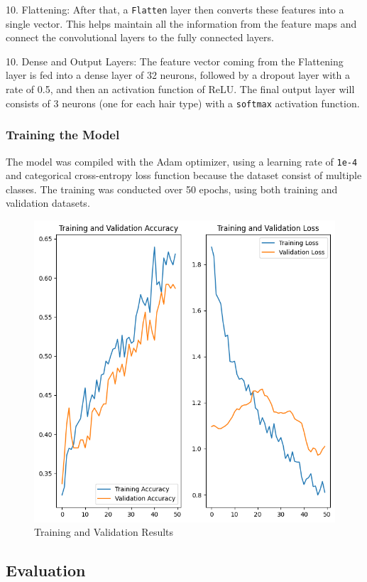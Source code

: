 10. Flattening: After that, a \texttt{Flatten} layer then converts these features into a single vector. This helps maintain all the information from the feature maps and connect the convolutional layers to the fully connected layers.

10. Dense and Output Layers: The feature vector coming from the Flattening layer is fed into a dense layer of 32 neurons, followed by a dropout layer with a rate of 0.5, and then an activation function of ReLU. The final output layer will consists of 3 neurons (one for each hair type) with a \texttt{softmax} activation function.

\subsubsection{Training the Model}

The model was compiled with the Adam optimizer, using a learning rate of \texttt{1e-4} and categorical cross-entropy loss function because the dataset consist of multiple classes. The training was conducted over 50 epochs, using both training and validation datasets.

\begin{figure}[H]
  \centering
  \includegraphics[width=0.8\linewidth]{figures/training_validation_results.png}
  \caption{Training and Validation Results}
  \label{fig:results}
\end{figure}

\subsection{Evaluation}

